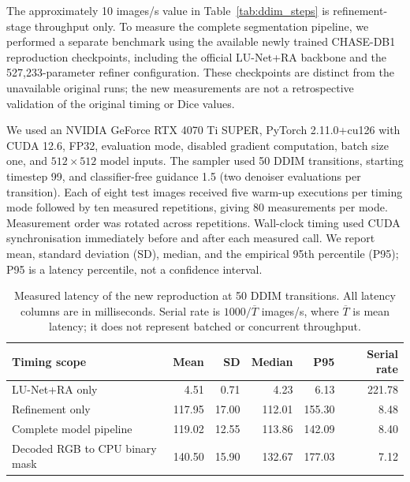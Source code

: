 \documentclass[jimaging,article,submit,pdftex,moreauthors]{Definitions/mdpi}%
\begin{document}
\label{sec:pipeline_latency}



The approximately 10 images/s value in Table~\ref{tab:ddim_steps} is refinement-stage throughput only. To measure the complete segmentation pipeline, we performed a separate benchmark using the available newly trained CHASE-DB1 reproduction checkpoints, including the official LU-Net+RA backbone and the 527,233-parameter refiner configuration. These checkpoints are distinct from the unavailable original runs; the new measurements are not a retrospective validation of the original timing or Dice values.



We used an NVIDIA GeForce RTX 4070 Ti SUPER, PyTorch 2.11.0+cu126 with CUDA 12.6, FP32, evaluation mode, disabled gradient computation, batch size one, and $512\times512$ model inputs. The sampler used 50 DDIM transitions, starting timestep 99, and classifier-free guidance 1.5 (two denoiser evaluations per transition). Each of eight test images received five warm-up executions per timing mode followed by ten measured repetitions, giving 80 measurements per mode. Measurement order was rotated across repetitions. Wall-clock timing used CUDA synchronisation immediately before and after each measured call. We report mean, standard deviation (SD), median, and the empirical 95th percentile (P95); P95 is a latency percentile, not a confidence interval.



\begin{table}[htbp]
\centering
\caption{Measured latency of the new reproduction at 50 DDIM transitions. All latency columns are in milliseconds. Serial rate is $1000/\overline{T}$ images/s, where $\overline{T}$ is mean latency; it does not represent batched or concurrent throughput.}
\label{tab:pipeline_latency}
\small
\begin{tabular}{lrrrrr}
\toprule
Timing scope & Mean & SD & Median & P95 & Serial rate \\
\midrule
LU-Net+RA only & 4.51 & 0.71 & 4.23 & 6.13 & 221.78 \\
Refinement only & 117.95 & 17.00 & 112.01 & 155.30 & 8.48 \\
Complete model pipeline & 119.02 & 12.55 & 113.86 & 142.09 & 8.40 \\
Decoded RGB to CPU binary mask & 140.50 & 15.90 & 132.67 & 177.03 & 7.12 \\
\bottomrule
\end{tabular}
\end{table}
\end{document}
